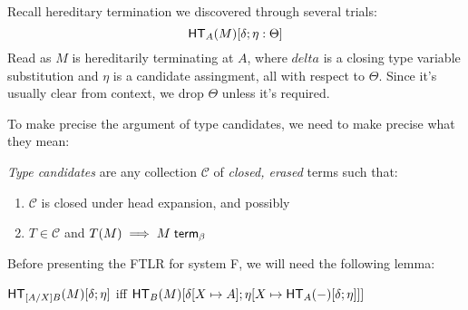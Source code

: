 \documentclass{article}
\begin{document}
Recall hereditary termination we discovered through several trials:
\[
\mathsf{HT}_{A}(M)[\delta;\eta : \Theta]
\]
Read as $M$ is hereditarily terminating at $A$, where $delta$ is a closing type variable substitution and $\eta$ is
a candidate assingment, all with respect to $\Theta$. Since it's usually clear from context, we drop $\Theta$ unless it's
required.

To make precise the argument of type candidates, we need to make precise what they mean:

\emph{Type candidates} are any collection $\mathcal{C}$ of \emph{closed, erased} terms such that:
\begin{enumerate}
\item $\mathcal{C}$ is closed under head expansion, and possibly
\item $T \in \mathcal{C}$ and $T(M) \implies {M} \; \mathsf{term}_{\beta}$
\end{enumerate}

Before presenting the FTLR for system F, we will need the following lemma:
\begin{lemma}[Compositionality]\label{lem:comp}
$\mathsf{HT}_{[A/X]B}(M)[\delta;\eta]$ iff $\mathsf{HT}_{B}(M)[\delta[X \mapsto A];\eta[X \mapsto \mathsf{HT}_{A}(-)[\delta;\eta]]]$
\end{lemma}
\end{document}
